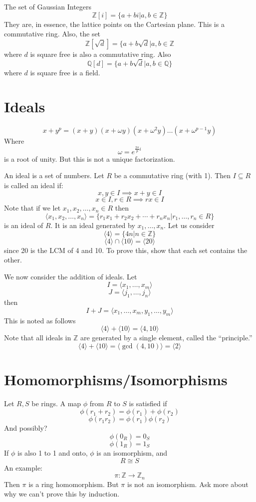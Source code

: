 \documentclass{article}
\begin{document}
The set of Gaussian Integers 
\[ \mathbb{Z}[i] = \{a + b i | a,b \in \mathbb{Z}\} \]
They are, in essence, the lattice points on the Cartesian plane. This is a
commutative ring. Also, the set
\[ \mathbb{Z}[\sqrt{d}] = \{a + b \sqrt{d} | a, b \in \mathbb{Z} \]
where $d$ is square free is also a commutative ring. Also
\[ \mathbb{Q}[d] = \{ a + b \sqrt{d} | a, b \in \mathbb{Q} \} \] where $d$ is
square free is a field. 

\section{Ideals}
\[ x + y^p = (x + y)(x + \omega y) (x + \omega^2 y) \ldots (x + \omega^{p-1} y)
\]
Where 
\[ \omega = e^{\frac{2 \pi}{p}i} \]
is a root of unity. But this is not a unique factorization. 

An ideal is a set of numbers. Let $R$ be a commutative ring (with 1). Then $I
\subseteq R$ is called an ideal if:
\[ x,y \in I \implies x+y\in I\]
\[ x \in I, r \in R \implies rx \in I \]
Note that if we let $x_1, x_2, \ldots, x_n \in R$ then
\[ \langle x_1, x_2, \ldots, x_n \rangle = \{ r_1 x_1 + r_2 x_2 + \cdots + r_n x_n | r_1,
\ldots, r_n \in R \} \]
is an ideal of $R$. It is an ideal generated by $x_1, \ldots, x_n$.
Let us consider 
\[ \langle 4\rangle  = \{4n | n \in \mathbb{Z}\} \]
\[ \langle 4\rangle  \cap \langle 10\rangle  = \langle 20\rangle  \]
since 20 is the LCM of 4 and 10. To prove this, show that each set contains the
other. 

We now consider the addition of ideals. Let
\[ I = \langle  x_1, \ldots, x_m \rangle  \]
\[ J = \langle  j_1, \ldots, j_n \rangle  \]
then
\[ I + J = \langle  x_1, \ldots, x_m, y_1, \ldots, y_m \rangle  \]
This is noted as follows
\[ \langle 4\rangle  + \langle 10\rangle  = \langle 4, 10\rangle  \]
Note that all ideals in $\mathbb{Z}$ are generated by a single element, called
the ``principle.'' 
\[ \langle 4\rangle  + \langle 10\rangle  = \langle \gcd(4,10)\rangle  = \langle 2\rangle  \]

\section{Homomorphisms/Isomorphisms}
Let $R,S$ be rings. A map $\phi$ from $R$ to $S$ is satisfied if
\[ \phi(r_1 + r_2) = \phi(r_1) + \phi(r_2) \]
\[ \phi( r_1 r_2 ) = \phi(r_1) \phi(r_2) \]
And possibly?
\[ \phi( 0_R ) = 0_S \]
\[ \phi( 1_R ) = 1_S \]
If $\phi$ is also 1 to 1 and onto, $\phi$ is an isomorphism, and
\[ R \cong S \]
An example:
\[ \pi : \mathbb{Z} \rightarrow \mathbb{Z}_n \]
Then $\pi$ is a ring homomorphism. But $\pi$ is not an isomorphism. Ask more
about why we can't prove this by induction. 
\end{document}
